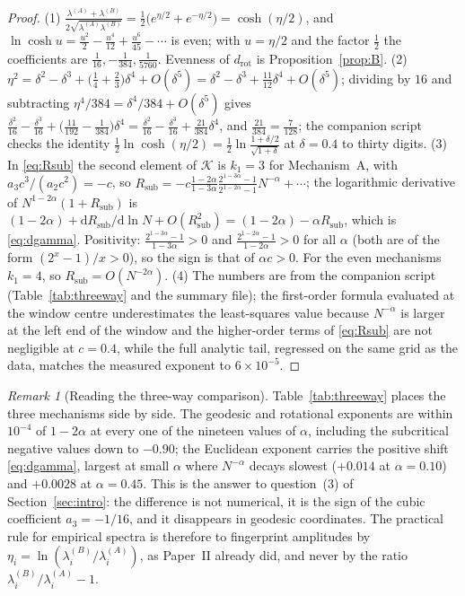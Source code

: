 \documentclass[11pt,reqno]{amsart}
\theoremstyle{plain}
\theoremstyle{definition}
\theoremstyle{remark}
\newtheorem{remark}[theorem]{Remark}
\numberwithin{equation}{section}
\newcommand{\dd}{\mathrm{d}}
\begin{document}
\begin{proof}
(1) $\frac{\lambda^{(A)}+\lambda^{(B)}}{2\sqrt{\lambda^{(A)}\lambda^{(B)}}}=\frac12\bigl(e^{\eta/2}+e^{-\eta/2}\bigr)=\cosh(\eta/2)$, and $\ln\cosh u=\frac{u^2}2-\frac{u^4}{12}+\frac{u^6}{45}-\cdots$ is even; with $u=\eta/2$ and the factor $\frac12$ the coefficients are $\frac1{16},-\frac1{384},\frac1{5760}$. Evenness of $d_{\mathrm{rot}}$ is Proposition~\ref{prop:B}. (2) $\eta^2=\delta^2-\delta^3+\bigl(\frac14+\frac23\bigr)\delta^4+O(\delta^5)=\delta^2-\delta^3+\frac{11}{12}\delta^4+O(\delta^5)$; dividing by $16$ and subtracting $\eta^4/384=\delta^4/384+O(\delta^5)$ gives $\frac{\delta^2}{16}-\frac{\delta^3}{16}+\bigl(\frac{11}{192}-\frac1{384}\bigr)\delta^4=\frac{\delta^2}{16}-\frac{\delta^3}{16}+\frac{21}{384}\delta^4$, and $\frac{21}{384}=\frac7{128}$; the companion script checks the identity $\frac12\ln\cosh(\eta/2)=\frac12\ln\frac{1+\delta/2}{\sqrt{1+\delta}}$ at $\delta=0.4$ to thirty digits. (3) In \eqref{eq:Rsub} the second element of $\mathcal K$ is $k_1=3$ for Mechanism~A, with $a_3c^3/(a_2c^2)=-c$, so $R_{\mathrm{sub}}=-c\frac{1-2\alpha}{1-3\alpha}\frac{2^{1-3\alpha}-1}{2^{1-2\alpha}-1}N^{-\alpha}+\cdots$; the logarithmic derivative of $N^{1-2\alpha}(1+R_{\mathrm{sub}})$ is $(1-2\alpha)+\dd R_{\mathrm{sub}}/\dd\ln N+O(R_{\mathrm{sub}}^2)=(1-2\alpha)-\alpha R_{\mathrm{sub}}$, which is \eqref{eq:dgamma}. Positivity: $\frac{2^{1-3\alpha}-1}{1-3\alpha}>0$ and $\frac{2^{1-2\alpha}-1}{1-2\alpha}>0$ for all $\alpha$ (both are of the form $(2^x-1)/x>0$), so the sign is that of $\alpha c>0$. For the even mechanisms $k_1=4$, so $R_{\mathrm{sub}}=O(N^{-2\alpha})$. (4) The numbers are from the companion script (Table~\ref{tab:threeway} and the summary file); the first-order formula evaluated at the window centre underestimates the least-squares value because $N^{-\alpha}$ is larger at the left end of the window and the higher-order terms of \eqref{eq:Rsub} are not negligible at $c=0.4$, while the full analytic tail, regressed on the same grid as the data, matches the measured exponent to $6\times10^{-5}$.
\end{proof}

\begin{remark}[Reading the three-way comparison]
Table~\ref{tab:threeway} places the three mechanisms side by side. The geodesic and rotational exponents are within $10^{-4}$ of $1-2\alpha$ at every one of the nineteen values of $\alpha$, including the subcritical negative values down to $-0.90$; the Euclidean exponent carries the positive shift \eqref{eq:dgamma}, largest at small $\alpha$ where $N^{-\alpha}$ decays slowest ($+0.014$ at $\alpha=0.10$) and $+0.0028$ at $\alpha=0.45$. This is the answer to question~(3) of Section~\ref{sec:intro}: the difference is not numerical, it is the sign of the cubic coefficient $a_3=-1/16$, and it disappears in geodesic coordinates. The practical rule for empirical spectra is therefore to fingerprint amplitudes by $\eta_i=\ln(\lambda^{(B)}_i/\lambda^{(A)}_i)$, as Paper~II already did, and never by the ratio $\lambda^{(B)}_i/\lambda^{(A)}_i-1$.
\end{remark}
\end{document}
